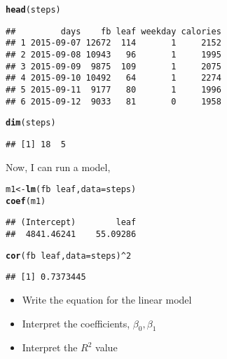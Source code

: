 \documentclass[10pt]{article}\usepackage[]{graphicx}\usepackage[]{color}
\makeatletter
\newcommand{\hlnum}[1]{\textcolor[rgb]{0.686,0.059,0.569}{#1}}%
\newcommand{\hlopt}[1]{\textcolor[rgb]{0,0,0}{#1}}%
\newcommand{\hlstd}[1]{\textcolor[rgb]{0.345,0.345,0.345}{#1}}%
\newcommand{\hlkwb}[1]{\textcolor[rgb]{0.69,0.353,0.396}{#1}}%
\newcommand{\hlkwc}[1]{\textcolor[rgb]{0.333,0.667,0.333}{#1}}%
\newcommand{\hlkwd}[1]{\textcolor[rgb]{0.737,0.353,0.396}{\textbf{#1}}}%
\newenvironment{kframe}{%
 \def\at@end@of@kframe{}%
 \ifinner\ifhmode%
  \def\at@end@of@kframe{\end{minipage}}%
  \begin{minipage}{\columnwidth}%
 \fi\fi%
 \def\FrameCommand##1{\hskip\@totalleftmargin \hskip-\fboxsep
 \colorbox{shadecolor}{##1}\hskip-\fboxsep
     \hskip-\linewidth \hskip-\@totalleftmargin \hskip\columnwidth}%
 \MakeFramed {\advance\hsize-\width
   \@totalleftmargin\z@ \linewidth\hsize
   \@setminipage}}%
 {\par\unskip\endMakeFramed%
 \at@end@of@kframe}
\newenvironment{knitrout}{}{} %
\makeatother
\begin{document}
\begin{knitrout}
\color{fgcolor}\begin{kframe}
\begin{alltt}
\hlkwd{head}\hlstd{(steps)}
\end{alltt}
\begin{verbatim}
##         days    fb leaf weekday calories
## 1 2015-09-07 12672  114       1     2152
## 2 2015-09-08 10943   96       1     1995
## 3 2015-09-09  9875  109       1     2075
## 4 2015-09-10 10492   64       1     2274
## 5 2015-09-11  9177   80       1     1996
## 6 2015-09-12  9033   81       0     1958
\end{verbatim}
\begin{alltt}
\hlkwd{dim}\hlstd{(steps)}
\end{alltt}
\begin{verbatim}
## [1] 18  5
\end{verbatim}
\end{kframe}
\end{knitrout}

Now, I can run a model,

\begin{knitrout}
\color{fgcolor}\begin{kframe}
\begin{alltt}
\hlstd{m1} \hlkwb{<-} \hlkwd{lm}\hlstd{(fb}\hlopt{~}\hlstd{leaf,} \hlkwc{data}\hlstd{=steps)}
\hlkwd{coef}\hlstd{(m1)}
\end{alltt}
\begin{verbatim}
## (Intercept)        leaf 
##  4841.46241    55.09286
\end{verbatim}
\begin{alltt}
\hlkwd{cor}\hlstd{(fb}\hlopt{~}\hlstd{leaf,} \hlkwc{data}\hlstd{=steps)}\hlopt{^}\hlnum{2}
\end{alltt}
\begin{verbatim}
## [1] 0.7373445
\end{verbatim}
\end{kframe}
\end{knitrout}

\begin{itemize}
  \itemsep0.5in
  \item Write the equation for the linear model
  \item Interpret the coefficients, $\beta_0, \beta_1$
  \item Interpret the $R^2$ value
  \vspace{0.5in}
\end{itemize}
\end{document}
